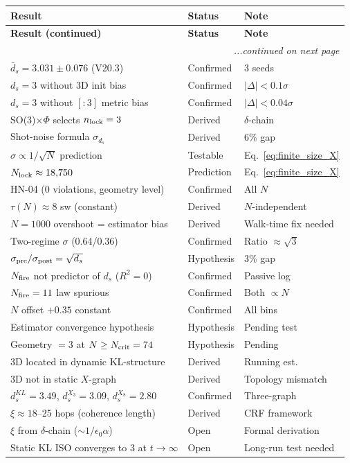 \documentclass[12pt, a4paper]{article}
\begin{document}
{\renewcommand{\arraystretch}{1.5}
\begin{longtable}{p{7.5cm}p{2.6cm}p{3.5cm}}
\toprule
\textbf{Result} & \textbf{Status} & \textbf{Note}\\
\midrule
\endfirsthead
\toprule
\textbf{Result (continued)} & \textbf{Status} & \textbf{Note}\\
\midrule
\endhead
\midrule
\multicolumn{3}{r}{\emph{...continued on next page}} \\
\endfoot
\bottomrule
\endlastfoot
$\bar{d}_s=3.031\pm 0.076$ (V20.3) & Confirmed & 3 seeds\\
$d_s=3$ without 3D init bias & Confirmed & $|\Delta|<0.1\sigma$\\
$d_s=3$ without $[:3]$ metric bias & Confirmed & $|\Delta|<0.04\sigma$\\
SO(3)$\times\Phi$ selects $n_{\rm lock}=3$ & Derived & $\delta$-chain\\
Shot-noise formula $\sigma_{d_s}$ & Derived & 6\% gap\\
$\sigma\propto 1/\sqrt{N}$ prediction & Testable & Eq.~\eqref{eq:finite_size_X}\\
$N_{\rm lock}\approx 18{,}750$ & Prediction & Eq.~\eqref{eq:finite_size_X}\\
HN-04 (0 violations, geometry level) & Confirmed & All $N$\\
$\tau(N)\approx 8$ sw (constant) & Derived & $N$-independent\\
$N=1000$ overshoot = estimator bias & Derived & Walk-time fix needed\\
Two-regime $\sigma$ (0.64/0.36) & Confirmed & Ratio $\approx\sqrt{3}$\\
$\sigma_{\rm pre}/\sigma_{\rm post}=\sqrt{d_s}$ & Hypothesis & 3\% gap\\
$N_{\rm fire}$ not predictor of $d_s$ ($R^2=0$) & Confirmed & Passive log\\
$N_{\rm fire}=11$ law spurious & Confirmed & Both $\propto N$\\
$N$ offset $+0.35$ constant & Confirmed & All bins\\
Estimator convergence hypothesis & Hypothesis & Pending test\\
Geometry $=3$ at $N\geq N_{\rm crit}=74$ & Hypothesis & Pending\\
3D located in dynamic KL-structure & Derived & Running est.\\
3D not in static $X$-graph & Derived & Topology mismatch\\
$d_s^{KL}=3.49$, $d_s^{X_3}=3.09$, $d_s^{X_8}=2.80$ & Confirmed & Three-graph\\
$\xi\approx 18$--25 hops (coherence length) & Derived & CRF framework\\
$\xi$ from $\delta$-chain ($\sim 1/\epsilon_0\alpha$) & Open & Formal derivation\\
Static KL ISO converges to 3 at $t\to\infty$ & Open & Long-run test needed\\
\end{longtable}
\vspace{-\parskip}
}
\end{document}
